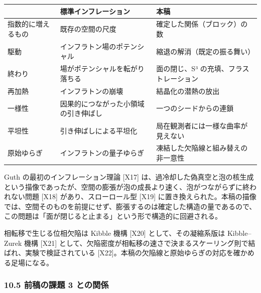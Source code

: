 \documentclass[
  a4paper,
]{ltjsarticle}
\newcounter{none} %
\begin{document}
{\def\LTcaptype{none} %
\begin{longtable}[]{@{}
  >{\raggedright\arraybackslash}p{}
  >{\raggedright\arraybackslash}p{}
  >{\raggedright\arraybackslash}p{}@{}}
\toprule\noalign{}
\begin{minipage}[b]{\linewidth}\raggedright
\end{minipage} & \begin{minipage}[b]{\linewidth}\raggedright
標準インフレーション
\end{minipage} & \begin{minipage}[b]{\linewidth}\raggedright
本稿
\end{minipage} \\
\midrule\noalign{}
\endhead
\bottomrule\noalign{}
\endlastfoot
指数的に増えるもの & 既存の空間の尺度 & 確定した関係（ブロック）の数 \\
駆動 & インフラトン場のポテンシャル & 縮退の解消（既定の振る舞い） \\
終わり & 場がポテンシャルを転がり落ちる & 面の閉じ、S³
の充填、フラストレーション \\
再加熱 & インフラトンの崩壊 & 結晶化の潜熱の放出 \\
一様性 & 因果的につながった小領域の引き伸ばし &
一つのシードからの連鎖 \\
平坦性 & 引き伸ばしによる平坦化 & 局在観測者には一様な曲率が見えない \\
原始ゆらぎ & インフラトンの量子ゆらぎ &
凍結した欠陥線と組み替えの非一意性 \\
\end{longtable}
}

Guth の最初のインフレーション理論 {[}X17{]}
は、過冷却した偽真空と泡の核生成という描像であったが、空間の膨張が泡の成長より速く、泡がつながらずに終われない問題
{[}X18{]} があり、スローロール型 {[}X19{]}
に置き換えられた。本稿の描像では、空間そのものを前提にせず、膨張するのは確定した構造の量であるので、この問題は「面が閉じると止まる」という形で構造的に回避される。

相転移で生じる位相欠陥は Kibble 機構 {[}X20{]} として、その凝縮系版は
Kibble--Zurek 機構 {[}X21{]}
として、欠陥密度が相転移の速さで決まるスケーリング則で結ばれ、実験で検証されている
{[}X22{]}。本稿の欠陥線と原始ゆらぎの対応を確かめる足場になる。

\subsubsection{10.5 前稿の課題 3
との関係}\label{ux524dux7a3fux306eux8ab2ux984c-3-ux3068ux306eux95a2ux4fc2}
\end{document}
